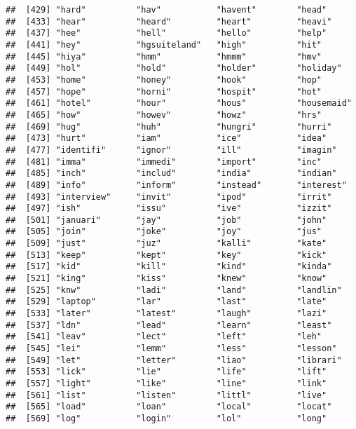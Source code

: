 \documentclass[]{article}
\begin{document}
\begin{verbatim}
##  [429] "hard"          "hav"           "havent"        "head"         
##  [433] "hear"          "heard"         "heart"         "heavi"        
##  [437] "hee"           "hell"          "hello"         "help"         
##  [441] "hey"           "hgsuiteland"   "high"          "hit"          
##  [445] "hiya"          "hmm"           "hmmm"          "hmv"          
##  [449] "hol"           "hold"          "holder"        "holiday"      
##  [453] "home"          "honey"         "hook"          "hop"          
##  [457] "hope"          "horni"         "hospit"        "hot"          
##  [461] "hotel"         "hour"          "hous"          "housemaid"    
##  [465] "how"           "howev"         "howz"          "hrs"          
##  [469] "hug"           "huh"           "hungri"        "hurri"        
##  [473] "hurt"          "iam"           "ice"           "idea"         
##  [477] "identifi"      "ignor"         "ill"           "imagin"       
##  [481] "imma"          "immedi"        "import"        "inc"          
##  [485] "inch"          "includ"        "india"         "indian"       
##  [489] "info"          "inform"        "instead"       "interest"     
##  [493] "interview"     "invit"         "ipod"          "irrit"        
##  [497] "ish"           "issu"          "ive"           "izzit"        
##  [501] "januari"       "jay"           "job"           "john"         
##  [505] "join"          "joke"          "joy"           "jus"          
##  [509] "just"          "juz"           "kalli"         "kate"         
##  [513] "keep"          "kept"          "key"           "kick"         
##  [517] "kid"           "kill"          "kind"          "kinda"        
##  [521] "king"          "kiss"          "knew"          "know"         
##  [525] "knw"           "ladi"          "land"          "landlin"      
##  [529] "laptop"        "lar"           "last"          "late"         
##  [533] "later"         "latest"        "laugh"         "lazi"         
##  [537] "ldn"           "lead"          "learn"         "least"        
##  [541] "leav"          "lect"          "left"          "leh"          
##  [545] "lei"           "lemm"          "less"          "lesson"       
##  [549] "let"           "letter"        "liao"          "librari"      
##  [553] "lick"          "lie"           "life"          "lift"         
##  [557] "light"         "like"          "line"          "link"         
##  [561] "list"          "listen"        "littl"         "live"         
##  [565] "load"          "loan"          "local"         "locat"        
##  [569] "log"           "login"         "lol"           "long"         

\end{verbatim}
\end{document}
